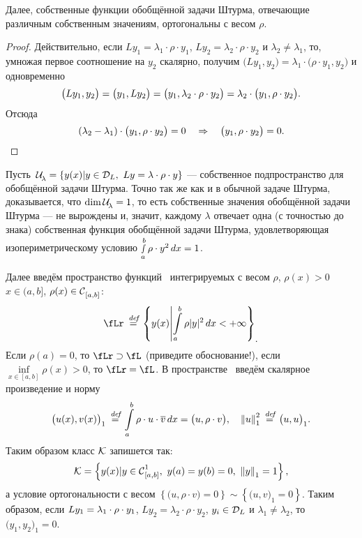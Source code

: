 Далее, собственные функции обобщённой задачи Штурма, отвечающие различным собственным значениям, ортогональны с весом $\rho$. 
\begin{proof}
	Действительно, если $Ly_1=\lambda_1\cdot\rho\cdot y_1$, $Ly_2=\lambda_2\cdot\rho\cdot y_2$ и $\lambda_2\neq\lambda_1$, то, умножая первое соотношение на $y_2$ скалярно, получим $\big(Ly_1,y_2\big)=\lambda_1\cdot\big(\rho\cdot y_1,y_2\big)$ и одновременно
	\begin{equation}
		\label{l8:eq:3}
		\hfill\big(Ly_1,y_2\big)=\big(y_1,Ly_2\big)=\big(y_1,\lambda_2\cdot\rho\cdot y_2\big)=\lambda_2\cdot\big(y_1,\rho\cdot y_2\big).\hfill
	\end{equation}	
	Отсюда
	\begin{equation}
		\hfill(\lambda_2-\lambda_1)\cdot\big(y_1,\rho\cdot y_2\big)=0\quad\Rightarrow\quad\big(y_1,\rho\cdot y_2\big)=0.\hfill
	\end{equation}
\end{proof}

Пусть\  $\Ul=\left\{y(x)|y\in\mc{D}_L,\ Ly=\lambda\cdot\rho\cdot y\right\}$ --- собственное подпространство для обобщённой задачи Штурма. Точно так же как и в обычной задаче Штурма, доказывается, что $\dim\Ul=1$, то есть собственные значения обобщённой задачи Штурма --- не вырождены и, значит, каждому $\lambda$ отвечает одна (с точностью до знака) собственная функция обобщённой задачи Штурма, удовлетворяющая изопериметрическому условию $\smallint\limits_a^b\rho\cdot y^2\,dx=1$.

Далее введём пространство функций \fLr\ интегрируемых с весом $\rho$, $\rho(x)>0$ $x\in(a,b]$, $\rho(x)\in\Cfn[{[a,b]}]{}$:
\begin{equation*}
	\hfill\fLr\eqdef\left\{y(x)\middle| \int\limits_a^b\rho|y|^2\,dx<+\infty\right\}_{\displaystyle.}\hfill
\end{equation*}
Если $\rho(a)=0$, то $\fLr\supset\fL$ (приведите обоснование!), если $\displaystyle\inf\limits_{x\in[a,b]}\rho(x)>0$, то $\fLr\?=\fL$. В пространстве \fLr\ введём скалярное произведение и норму
\begin{equation*}
	\hfill\big(u(x),v(x)\big)_1\eqdef\int\limits_a^b\rho\cdot u\cdot\overline{v}\,dx=\big(u,\rho\cdot v\big),\quad{\norm{u}}_1^2\eqdef\big(u,u\big)_1.\hfill
\end{equation*}
Таким образом класс $\K$ запишется так:
\begin{equation*}
	\hfill\K=\left\{y(x)|y\in\Cfn[{[a,b]}]{1},\ y(a)=y(b)=0,\ \norm{y}_1=1\right\},\hfill
\end{equation*}
а условие ортогональности с весом $\left\{\big(u,\rho\cdot v\big)=0\right\}\sim\left\{\big(u,v\big)_1=0\right\}$. Таким образом, если $Ly_1\?=\lambda_1\cdot\rho\cdot y_1$, $Ly_2=\lambda_2\cdot\rho\cdot y_2$, $y_i\in\mc{D}_L$ и $\lambda_1\neq\lambda_2$, то $\big(y_1,y_2\big)_1=0$.

